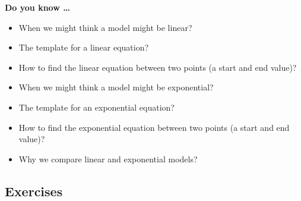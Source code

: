 
 

\noindent \textbf{Do you know \ldots}

\begin{itemize}

\item When we might think a model might be linear? 
\item The template for a linear equation? 
\item How to find the linear equation between two points (a start and end value)? 

\item When we might think a model might be exponential? 
\item The template for an exponential equation? 
\item How to find the exponential equation between two points (a start and end value)? 

\item Why we compare linear and exponential models? 
  
\end{itemize}

\subsection*{Exercises}

